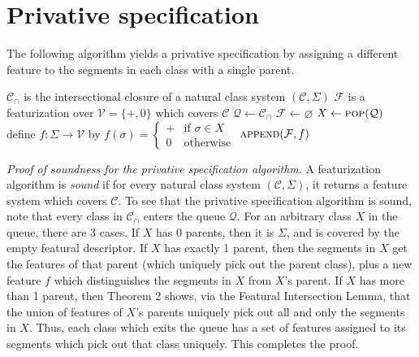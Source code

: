 \documentclass[11pt, oneside]{article}   	%
\begin{document}
 \section{Privative specification}

The following algorithm yields a privative specification by assigning a different feature  to the segments in each class with a single parent.
 
\noindent \begin{algorithmic}
    \REQUIRE $\mathcal C_\cap$ is the intersectional closure of a natural class system $(\mathcal C, \Sigma)$
    \ENSURE $\mathcal F$ is a featurization over $\mathcal V = \{ +, 0 \}$ which covers $\mathcal C$
    \STATE
    \STATE $\mathcal Q \leftarrow \mathcal C_\cap$
    \STATE $\mathcal F \leftarrow \varnothing$
    \STATE
        \STATE $X \leftarrow \textsc{pop}(\mathcal Q)$
            \STATE define $f : \Sigma \rightarrow \mathcal V$ by $f(\sigma) = \begin{cases}
                + & \mbox{if } \sigma \in X \\
                0 & \mbox{otherwise}
                \end{cases} $
            \STATE $\textsc{append}(\mathcal F, f)$
        \ENDIF
    \ENDWHILE
\end{algorithmic}

\vspace{\baselineskip} \noindent \textit{Proof of soundness for the privative specification algorithm}. A featurization algorithm is \textit{sound} if for every natural class system $(\mathcal C, \Sigma)$, it returns a feature system which covers $\mathcal C$. To see that the privative specification algorithm is sound, note that every class in $\mathcal C_\cap$ enters the queue $\mathcal Q$. For an arbitrary class $X$ in the queue, there are 3 cases. If $X$ has 0 parents, then it is $\Sigma$, and is covered by the empty featural descriptor. If $X$ has exactly 1 parent, then the segments in $X$ get the features of that parent (which uniquely pick out the parent class), plus a new feature $f$ which distinguishes the segments in $X$ from $X$'s parent. If $X$ has more than 1 parent, then Theorem 2 shows, via the Featural Intersection Lemma, that the union of features of $X$'s parents uniquely pick out all and only the segments in $X$. Thus, each class which exits the queue has a set of features assigned to its segments which pick out that class uniquely. This completes the proof.
\end{document}
